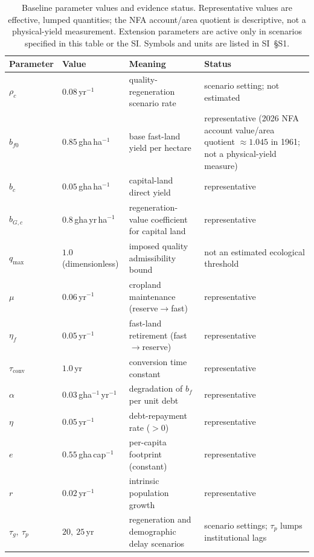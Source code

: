 \documentclass[preprint,12pt,authoryear]{elsarticle}
\newcommand{\tconv}{\tau_{\mathrm{conv}}}
\begin{document}
\begin{table}[!htbp]
\centering\footnotesize
\renewcommand{\arraystretch}{0.80}
\caption{Baseline parameter values and evidence status. Representative values are effective, lumped quantities; the NFA account/area quotient is descriptive, not a physical-yield measurement. Extension parameters are active only in scenarios specified in this table or the SI. Symbols and units are listed in SI~\S S1.}
\label{tab:params}
\setlength{\tabcolsep}{4pt}
\begin{tabularx}{\textwidth}{@{}>{\raggedright\arraybackslash}p{} >{\raggedright\arraybackslash}p{} >{\raggedright\arraybackslash}X >{\raggedright\arraybackslash}p{}@{}}
\toprule
Parameter & Value & Meaning & Status \\
\midrule
$\rho_c$ & $0.08$\,yr$^{-1}$ & quality-regeneration scenario rate & scenario setting; not estimated \\
$b_{f0}$ & $0.85$\,gha\,ha$^{-1}$ & base fast-land yield per hectare & representative (2026 NFA account value/area quotient $\approx1.045$ in 1961; not a physical-yield measure) \\
$b_c$ & $0.05$\,gha\,ha$^{-1}$ & capital-land direct yield & representative \\
$b_{G,c}$ & $0.8$\,gha\,yr\,ha$^{-1}$ & regeneration-value coefficient for capital land & representative \\
$q_{\max}$ & $1.0$ (dimensionless) & imposed quality admissibility bound & not an estimated ecological threshold \\
$\mu$ & $0.06$\,yr$^{-1}$ & cropland maintenance (reserve$\to$fast) & representative \\
$\eta_f$ & $0.05$\,yr$^{-1}$ & fast-land retirement (fast$\to$reserve) & representative \\
$\tconv$ & $1.0$\,yr & conversion time constant & representative \\
$\alpha$ & $0.03$\,gha$^{-1}$\,yr$^{-1}$ & degradation of $b_f$ per unit debt & representative \\
$\eta$ & $0.05$\,yr$^{-1}$ & debt-repayment rate ($>0$) & representative \\
$e$ & $0.55$\,gha\,cap$^{-1}$ & per-capita footprint (constant) & representative \\
$r$ & $0.02$\,yr$^{-1}$ & intrinsic population growth & representative \\
$\tau_g,\ \tau_p$ & $20,\ 25$\,yr & regeneration and demographic delay scenarios & scenario settings; $\tau_p$ lumps institutional lags \\

\end{tabularx}
\end{table}
\end{document}

